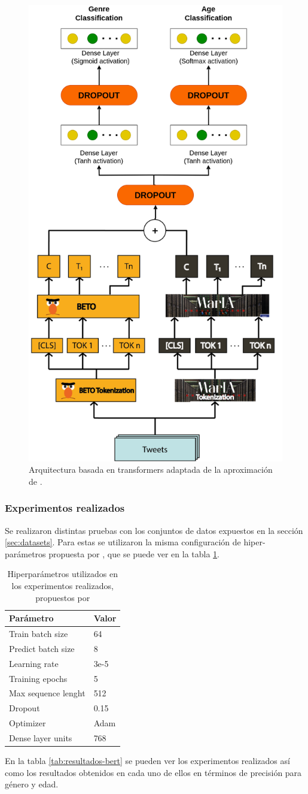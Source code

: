 \noindent\begin{figure}[hp!]
  \centering
    \includegraphics[height=0.8\textwidth]{imaxes/diagrama_arquitectura_profiler.png}
  \caption{Arquitectura basada en transformers adaptada de la aproximación de \cite{loscalis22}.}
  \label{fig:arquitectura_adaptada}
\end{figure}

\subsubsection{Experimentos realizados}
Se realizaron distintas pruebas con los conjuntos de datos expuestos en la sección \ref{sec:datasets}. Para estas se utilizaron la misma configuración de hiper-parámetros propuesta por \cite{loscalis22}, que se puede ver en la tabla \ref{tab:hiperparametros}. 

\begin{table}[hp!]
    \centering
    \begin{tabular}{ll}
        \hline
        \textbf{Parámetro}  & \textbf{Valor} \\ \hline
        Train batch size    & 64             \\
        Predict batch size  & 8              \\
        Learning rate       & 3e-5           \\
        Training epochs     & 5              \\
        Max sequence lenght & 512            \\
        Dropout             & 0.15           \\
        Optimizer           & Adam           \\
        Dense layer units   & 768            \\ \hline
    \end{tabular}
    \caption{Hiperparámetros utilizados en los experimentos realizados, propuestos por \cite{loscalis22}}
    \label{tab:hiperparametros}
\end{table}
En la tabla \ref{tab:resultados-bert} se pueden ver los experimentos realizados así como los resultados obtenidos en cada uno de ellos en términos de precisión para género y edad.

